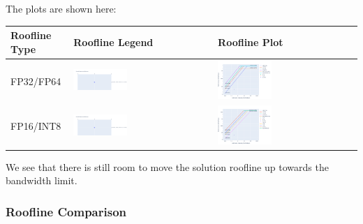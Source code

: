 \documentclass[
]{article}
\begin{document}
The plots are shown here:
\begin{longtable}[]{@{}lll@{}}
\toprule
Roofline Type & Roofline Legend & Roofline Plot\tabularnewline
\midrule
\endhead
FP32/FP64 &
\includegraphics[width=0.4\textwidth,height=0.4\textheight]{omniperf/lds_occupancy_limit/8575851bf3f9ac056a2eae0e721d44cde6e9378a.png} &
\includegraphics[width=0.4\textwidth,height=0.4\textheight]{omniperf/lds_occupancy_limit/4bf3d5203e97551cf1af4e09bb575a9494da6c67.png} \tabularnewline
FP16/INT8 &
\includegraphics[width=0.4\textwidth,height=0.4\textheight]{omniperf/lds_occupancy_limit/8575851bf3f9ac056a2eae0e721d44cde6e9378a.png} & \includegraphics[width=0.4\textwidth,height=0.4\textheight]{omniperf/lds_occupancy_limit/b90d84aa86564be3a7741b32c5d05083b7b9f881.png}
\tabularnewline
\bottomrule
\end{longtable}


We see that there is still room to move the solution roofline up towards
the bandwidth limit.

\hypertarget{roofline-comparison2}{%
\subsubsection{Roofline Comparison}\label{roofline-comparison2}}
\end{document}
